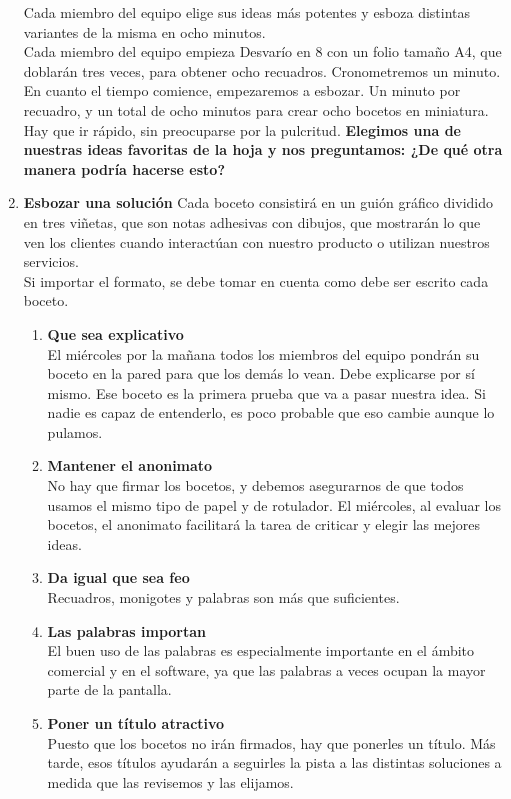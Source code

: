 \documentclass[10pt]{article}
\begin{document}
\begin{multicols}{2}
\begin{enumerate}[\bfseries 1.]
Cada miembro del equipo elige sus
ideas más potentes y esboza distintas variantes de la misma en ocho minutos.\\
Cada miembro del equipo empieza Desvarío en 8 con un folio tamaño A4, que doblarán tres veces, para obtener ocho recuadros. Cronometremos un minuto. En cuanto el tiempo comience, empezaremos a esbozar. Un minuto por recuadro, y un total de ocho minutos para crear ocho bocetos en miniatura. Hay que ir rápido, sin preocuparse por la pulcritud. \textbf{Elegimos una de nuestras ideas favoritas de la hoja y nos preguntamos: ¿De qué otra manera podría hacerse esto?}
\item \textbf{Esbozar una solución}
Cada boceto consistirá en un guión gráfico dividido en tres viñetas, que son notas adhesivas con dibujos, que mostrarán lo que ven los clientes cuando interactúan con nuestro producto o utilizan nuestros servicios.\\
Si importar el formato, se debe tomar en cuenta como debe ser escrito cada boceto.
\begin{enumerate}[\bfseries a.]
\item \textbf{Que sea explicativo}\\
El miércoles por la mañana todos los miembros del equipo pondrán su boceto en la pared para que los demás lo vean. Debe explicarse por sí mismo. Ese boceto es la primera prueba que va a pasar nuestra idea. Si nadie es capaz de entenderlo, es poco probable que eso cambie aunque lo pulamos.
\item \textbf{Mantener el anonimato}\\
No hay que firmar los bocetos, y debemos asegurarnos de que todos usamos el mismo tipo de papel y de rotulador. El miércoles, al evaluar los bocetos, el anonimato facilitará la tarea de criticar y elegir las mejores ideas.
\item \textbf{Da igual que sea feo}\\
Recuadros, monigotes y palabras son más que suficientes. 
\item \textbf{Las palabras importan}\\
El buen uso de las palabras es especialmente importante en el ámbito comercial y en el software, ya que las palabras a veces ocupan la mayor parte de la pantalla.
\item \textbf{Poner un título atractivo}\\
Puesto que los bocetos no irán firmados, hay que ponerles un título. Más tarde, esos títulos ayudarán a seguirles la pista a las distintas soluciones a medida que las revisemos y las elijamos.
\end{enumerate}
\end{enumerate}

\end{multicols}
\end{document}
